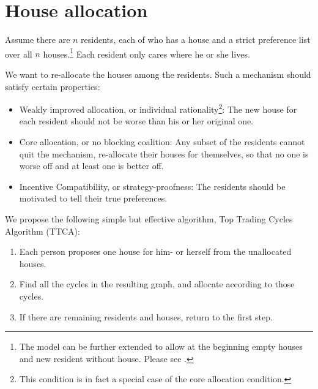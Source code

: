 \documentclass[openany]{book}
\theoremstyle{remark}
\begin{document}
\section{House allocation}
Assume there are $n$ residents, each of who has a house and a strict preference list over all $n$ houses.\footnote{The model can be further extended to allow at the beginning empty houses and new resident without house. Please see \cite{AS99}.} Each resident only cares where he or she lives.

We want to re-allocate the houses among the residents. Such a mechanism should satisfy certain properties:
\begin{itemize}
    \item Weakly improved allocation, or individual rationality\footnote{This condition is in fact a special case of the core allocation condition.}: The new house for each resident should not be worse than his or her original one.
    \item Core allocation, or no blocking coalition: Any subset of the residents cannot quit the mechanism, re-allocate their houses for themselves, so that no one is worse off and at least one is better off.
    \item Incentive Compatibility, or strategy-proofness: The residents should be motivated to tell their true preferences.
\end{itemize}

We propose the following simple but effective algorithm, Top Trading Cycles Algorithm (TTCA):
\begin{enumerate}
    \item Each person proposes one house for him- or herself from the unallocated houses.
    \item Find all the cycles in the resulting graph, and allocate according to those cycles.
    \item If there are remaining residents and houses, return to the first step.
\end{enumerate}
\end{document}
